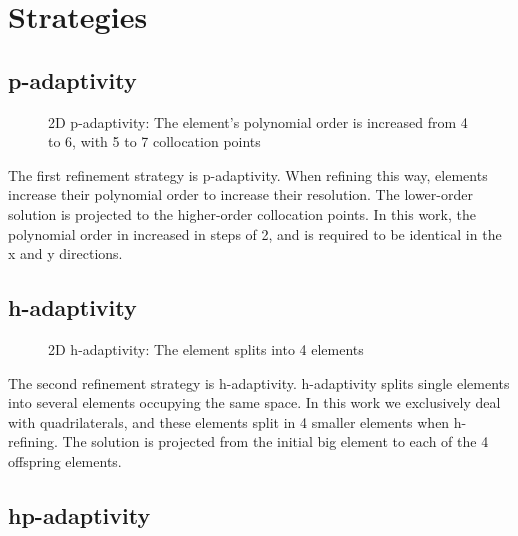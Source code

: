 \section{Strategies} \label{section:adaptive_mesh_refinement:adaptivity_strategies}

\subsection{p-adaptivity} \label{section:adaptive_mesh_refinement:adaptivity_strategies:p-adaptivity}

\begin{figure}[H]
	\centering
	
	\caption{2D p-adaptivity: The element's polynomial order is increased from 4 to 6, with 5 to 7 collocation points}
	\label{fig:p-adaptivity}
\end{figure}

The first refinement strategy is p-adaptivity. When refining this way, elements increase their
polynomial order to increase their resolution. The lower-order solution is projected to the
higher-order collocation points. In this work, the polynomial order in increased in steps of 2, and
is required to be identical in the x and y directions. 

\subsection{h-adaptivity} \label{section:adaptive_mesh_refinement:adaptivity_strategies:h-adaptivity}

\begin{figure}[H]
	\centering
	
	\caption{2D h-adaptivity: The element splits into 4 elements}
	\label{fig:h-adaptivity}
\end{figure}

The second refinement strategy is h-adaptivity. h-adaptivity splits single elements into several
elements occupying the same space. In this work we exclusively deal with quadrilaterals, and these
elements split in 4 smaller elements when h-refining. The solution is projected from the initial big
element to each of the 4 offspring elements.

\subsection{hp-adaptivity} \label{section:adaptive_mesh_refinement:adaptivity_strategies:hp-adaptivity}


